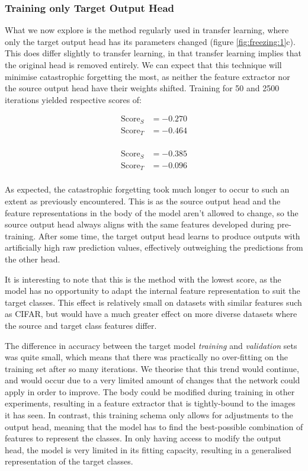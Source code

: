\documentclass{report}
\newcommand{\SCORE}[2]{
	\begin{align*}
	\text{Score}_S &= #1 \\
	\text{Score}_T &= #2 \\
	\end{align*}
}
\begin{document}
	\subsubsection{Training only Target Output Head}
	What we now explore is the method regularly used in transfer learning, where only the target output head has its parameters changed (figure \ref{fig:freezing:1}c). This does differ slightly to transfer learning, in that transfer learning implies that the original head is removed entirely. We can expect that this technique will minimise catastrophic forgetting the most, as neither the feature extractor nor the source output head have their weights shifted. Training for 50 and 2500 iterations yielded respective scores of:
	\SCORE{-0.270}{-0.464}
	\SCORE{-0.385}{-0.096}
	As expected, the catastrophic forgetting took much longer to occur to such an extent as previously encountered. This is as the source output head and the feature representations in the body of the model aren't allowed to change, so the source output head always aligns with the same features developed during pre-training. After some time, the target output head learns to produce outputs with artificially high raw prediction values, effectively outweighing the predictions from the other head. \par
	It is interesting to note that this is the method with the lowest score, as the model has no opportunity to adapt the internal feature representation to suit the target classes. This effect is relatively small on datasets with similar features such as CIFAR, but would have a much greater effect on more diverse datasets where the source and target class features differ. \par
	The difference in accuracy between the target model \emph{training} and \emph{validation} sets was quite small, which means that there was practically no over-fitting on the training set after so many iterations. We theorise that this trend would continue, and would occur due to a very limited amount of changes that the network could apply in order to improve. The body could be modified during training in other experiments, resulting in a feature extractor that is tightly-bound to the images it has seen. In contrast, this training schema only allows for adjustments to the output head, meaning that the model has to find the best-possible combination of features to represent the classes.	In only having access to modify the output head, the model is very limited in its fitting capacity, resulting in a generalised representation of the target classes. \par
\end{document}
